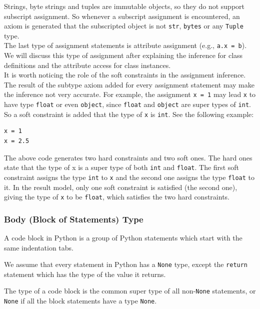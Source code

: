 Strings, byte strings and tuples are immutable objects, so they do not support subscript assignment. So whenever a subscript assignment is encountered, an axiom is generated that the subscripted object is not \lstinline|str|, \lstinline|bytes| or any \lstinline|Tuple| type.\\

The last type of assignment statements is attribute assignment (e.g., \lstinline|a.x = b|). We will discuss this type of assignment after explaining the inference for class definitions and the attribute access for class instances.\\

It is worth noticing the role of the soft constraints in the assignment inference. The result of the subtype axiom added for every assignment statement may make the inference not very accurate. For example, the assignment \lstinline|x = 1| may lead \lstinline|x| to have type \lstinline|float| or even \lstinline|object|, since \lstinline|float| and \lstinline|object| are super types of \lstinline|int|. So a soft constraint is added that the type of \lstinline|x| is \lstinline|int|. See the following example:
\begin{lstlisting}
x = 1
x = 2.5
\end{lstlisting}

The above code generates two hard constraints and two soft ones. The hard ones state that the type of x is a super type of both \lstinline|int| and \lstinline|float|. The first soft constraint assigns the type \lstinline|int| to \lstinline|x| and the second one assigns the type \lstinline|float| to it. In the result model, only one soft constraint is satisfied (the second one), giving the type of \lstinline|x| to be \lstinline|float|, which satisfies the two hard constraints.

\subsubsection{Body (Block of Statements) Type}
A code block in Python is a group of Python statements which start with the same indentation tabs.

We assume that every statement in Python has a \lstinline|None| type, except the \lstinline|return| statement which has the type of the value it returns.

The type of a code block is the common super type of all non-\lstinline|None| statements, or \lstinline|None| if all the block statements have a type \lstinline|None|.

